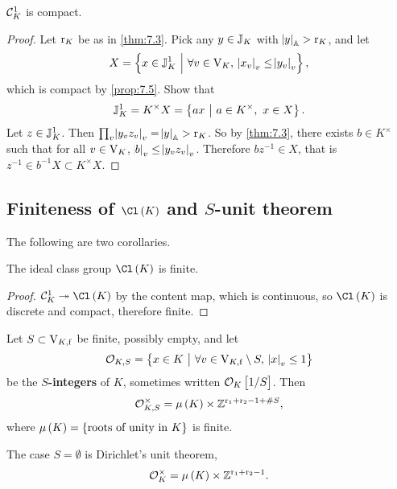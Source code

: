 \begin{theorem}
\label{thm:7.4}
$ \mathcal{C}_K^1 $ is compact.
\end{theorem}

\begin{proof}
Let $ \mathrm{r}_K $ be as in \ref{thm:7.3}. Pick any $ y \in \mathbb{J}_K $ with $ \abs{y}_{\mathbb{A}} > \mathrm{r}_K $, and let
$$ X = \cbr{x \in \JJ_K^1 \st \forall v \in \V_K, \ \abs{x_v}_v \le \abs{y_v}_v}, $$
which is compact by \ref{prop:7.5}. Show that
$$ \JJ_K^1 = K^\times X = \cbr{ax \st a \in K^\times, \ x \in X}. $$
Let $ z \in \mathbb{J}_K^1 $. Then $ \prod_v \abs{y_vz_v}_v = \abs{y}_{\mathbb{A}} > \mathrm{r}_K $. So by \ref{thm:7.3}, there exists $ b \in K^\times $ such that for all $ v \in \mathrm{V}_K $, $ \abs{b}_v \le \abs{y_vz_v}_v $. Therefore $ bz^{-1} \in X $, that is $ z^{-1} \in b^{-1}X \subset K^\times X $.
\end{proof}

\pagebreak

\subsection{Finiteness of \texorpdfstring{$ \Cl\br{K} $}{ideal class group} and \texorpdfstring{$ S $}{S}-unit theorem}

The following are two corollaries.

\begin{corollary}
The ideal class group $ \Cl\br{K} $ is finite.
\end{corollary}

\begin{proof}
$ \CCC_K^1 \twoheadrightarrow \Cl\br{K} $ by the content map, which is continuous, so $ \Cl\br{K} $ is discrete and compact, therefore finite.
\end{proof}

\begin{corollary}
\label{cor:7.7}
Let $ S \subset \mathrm{V}_{K, \mathrm{f}} $ be finite, possibly empty, and let
$$ \OOO_{K, S} = \cbr{x \in K \st \forall v \in \V_{K, \f} \setminus S, \ \abs{x}_v \le 1} $$
be the \textbf{$ S $-integers} of $ K $, sometimes written $ \OOO_K\sbr{1 / S} $. Then
$$ \OOO_{K, S}^\times = \mu\br{K} \times \ZZ^{\r_1 + \r_2 - 1 + \#S}, $$
where $ \mu\br{K} = \cbr{\text{roots of unity in} \ K} $ is finite.
\end{corollary}

The case $ S = \emptyset $ is Dirichlet's unit theorem,
$$ \OOO_K^\times = \mu\br{K} \times \ZZ^{\r_1 + \r_2 - 1}. $$

